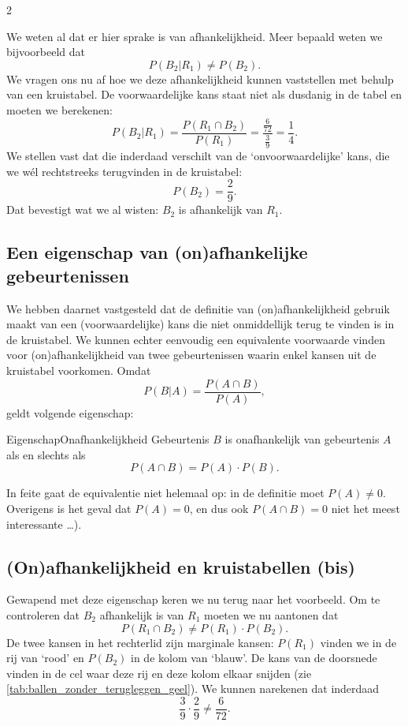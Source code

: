 \begin{multicols} {2}

We weten al dat er hier sprake is van afhankelijkheid. Meer bepaald weten we bijvoorbeeld dat
$$P(B_2|R_1) \neq P(B_2).$$ 
We vragen ons nu af hoe we deze afhankelijkheid kunnen vaststellen met behulp van een kruistabel. De voorwaardelijke kans staat niet als dusdanig in de tabel en moeten we berekenen:
$$P(B_2|R_1 )=\frac{P(R_1 \cap B_2)}{P(R_1)}=\frac{\frac{6}{72}}{\frac{3}{9}}=\frac{1}{4}.$$
We stellen vast dat die inderdaad verschilt van de ‘onvoorwaardelijke’ kans, die we wél rechtstreeks terugvinden in de kruistabel: 
$$P(B_2)=\frac{2}{9}.$$
Dat bevestigt wat we al wisten: $B_2$ is afhankelijk van $R_1$.

\subsection*{Een eigenschap van (on)afhankelijke gebeurtenissen}

We hebben daarnet vastgesteld dat de definitie van (on)afhankelijkheid gebruik maakt van een (voorwaardelijke) kans die niet onmiddellijk terug te vinden is in de kruistabel. We kunnen echter eenvoudig een equivalente voorwaarde vinden voor (on)afhankelijkheid van twee gebeurtenissen waarin enkel kansen uit de kruistabel voorkomen. Omdat
$$P(B|A)=\frac{P(A \cap B)}{P(A)},$$
geldt volgende eigenschap:

\begin{kader}{Eigenschap}{Onafhankelijkheid}
Gebeurtenis  $B$ is onafhankelijk van gebeurtenis $A$ als en slechts als
$$P(A \cap B)=P(A) \cdot P(B).$$
\end{kader}

In feite gaat de equivalentie niet helemaal op: in de definitie moet $P(A) \neq 0$. Overigens is het geval dat $P(A)=0$, en dus ook $P(A \cap B)=0$ niet het meest interessante \dots).

\subsection*{(On)afhankelijkheid en kruistabellen (bis)}

Gewapend met deze eigenschap keren we nu terug naar het voorbeeld. Om te controleren dat $B_2$ afhankelijk is van $R_1$ moeten we nu aantonen dat
$$P(R_1 \cap B_2) \neq P(R_1) \cdot P(B_2).$$
De twee kansen in het rechterlid zijn marginale kansen: $P(R_1)$ vinden we in de rij van ‘rood’ en $P(B_2)$ in de  kolom van ‘blauw’. De kans van de doorsnede vinden in de cel waar deze rij en deze kolom elkaar snijden (zie \autoref{tab:ballen_zonder_terugleggen_geel}). We kunnen narekenen dat inderdaad 
$$\frac{3}{9} \cdot \frac{2}{9} \neq \frac{6}{72}.$$

\end{multicols}

